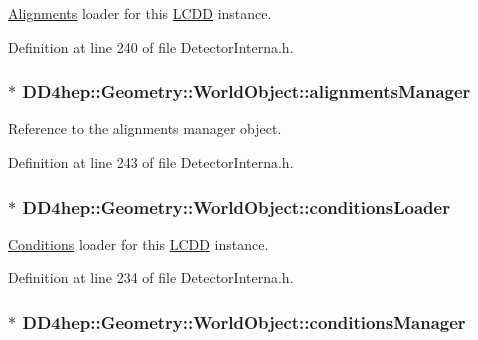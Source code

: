 \hyperlink{namespace_d_d4hep_1_1_alignments}{Alignments} loader for this \hyperlink{class_d_d4hep_1_1_geometry_1_1_l_c_d_d}{LCDD} instance. 

Definition at line 240 of file DetectorInterna.h.\hypertarget{class_d_d4hep_1_1_geometry_1_1_world_object_a4cd3b67817855becace65515c1df4240}{
\subsubsection[{alignmentsManager}]{$\ast$ {\bf DD4hep::Geometry::WorldObject::alignmentsManager}}}
\label{class_d_d4hep_1_1_geometry_1_1_world_object_a4cd3b67817855becace65515c1df4240}


Reference to the alignments manager object. 

Definition at line 243 of file DetectorInterna.h.\hypertarget{class_d_d4hep_1_1_geometry_1_1_world_object_a9c6db420466092543b90e99e38a2727c}{
\subsubsection[{conditionsLoader}]{$\ast$ {\bf DD4hep::Geometry::WorldObject::conditionsLoader}}}
\label{class_d_d4hep_1_1_geometry_1_1_world_object_a9c6db420466092543b90e99e38a2727c}


\hyperlink{namespace_d_d4hep_1_1_conditions}{Conditions} loader for this \hyperlink{class_d_d4hep_1_1_geometry_1_1_l_c_d_d}{LCDD} instance. 

Definition at line 234 of file DetectorInterna.h.\hypertarget{class_d_d4hep_1_1_geometry_1_1_world_object_a325a757896034d63270e1decfc883b8b}{
\subsubsection[{conditionsManager}]{$\ast$ {\bf DD4hep::Geometry::WorldObject::conditionsManager}}}
\label{class_d_d4hep_1_1_geometry_1_1_world_object_a325a757896034d63270e1decfc883b8b}


